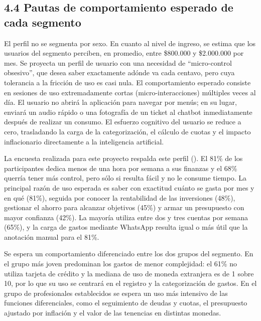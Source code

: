 \subsection*{4.4 Pautas de comportamiento esperado de cada
segmento}\label{pautas-de-comportamiento-esperado-de-cada-segmento}

El perfil no se segmenta por sexo. En cuanto al nivel de ingreso, se
estima que los usuarios del segmento perciben, en promedio, entre
\$800.000 y \$2.000.000 por mes. Se proyecta un perfil de usuario con
una necesidad de ``micro-control obsesivo'', que desea saber exactamente
adónde va cada centavo, pero cuya tolerancia a la fricción de uso es
casi nula. El comportamiento esperado consiste en sesiones de uso
extremadamente cortas (micro-interacciones) múltiples veces al día. El
usuario no abrirá la aplicación para navegar por menús; en su lugar,
enviará un audio rápido o una fotografía de un ticket al chatbot
inmediatamente después de realizar un consumo. El esfuerzo cognitivo del
usuario se reduce a cero, trasladando la carga de la categorización, el
cálculo de cuotas y el impacto inflacionario directamente a la
inteligencia artificial.

La encuesta realizada para este proyecto respalda este perfil
(). El 81\% de los
participantes dedica menos de una hora por semana a sus finanzas y el
68\% querría tener más control, pero sólo si resulta fácil y no le
consume tiempo. La principal razón de uso esperada es saber con
exactitud cuánto se gasta por mes y en qué (81\%), seguida por conocer
la rentabilidad de las inversiones (48\%), gestionar el ahorro para
alcanzar objetivos (45\%) y armar un presupuesto con mayor confianza
(42\%). La mayoría utiliza entre dos y tres cuentas por semana (65\%), y
la carga de gastos mediante WhatsApp resulta igual o más útil que la
anotación manual para el 81\%.

Se espera un comportamiento diferenciado entre los dos grupos del
segmento. En el grupo más joven predominan los gastos de menor
complejidad: el 61\% no utiliza tarjeta de crédito y la mediana de uso
de moneda extranjera es de 1 sobre 10, por lo que su uso se centrará en
el registro y la categorización de gastos. En el grupo de profesionales
establecidos se espera un uso más intensivo de las funciones
diferenciales, como el seguimiento de deudas y cuotas, el presupuesto
ajustado por inflación y el valor de las tenencias en distintas monedas.

